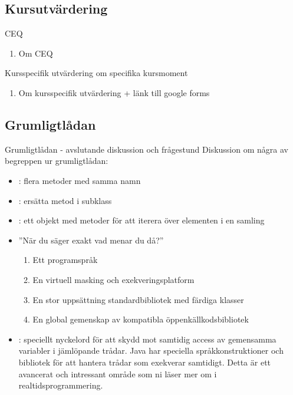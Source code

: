 \documentclass{lecturenotes}
\begin{document}
\subsection{Kursutvärdering}
\begin{Slide}{CEQ}
\begin{enumerate}
\item Om CEQ
\end{enumerate}
\end{Slide}

\begin{Slide}{Kursspecifik utvärdering om specifika kursmoment}
\begin{enumerate}
\item Om kursspecifik utvärdering + länk till google forms
\end{enumerate}
\end{Slide}

\subsection{Grumligtlådan}
\begin{Slide}{Grumligtlådan - avslutande diskussion och frågestund}
Diskussion om några av begreppen ur grumligtlådan: 
\begin{itemize}
\item {}: flera metoder med samma namn
\item {}: ersätta metod i subklass
\item {}: ett objekt med metoder för att iterera över elementen i en samling
\item ''När du säger  exakt vad menar du då?''
\begin{enumerate}
\item Ett programspråk
\item En virtuell masking och exekveringsplatform
\item En stor uppsättning standardbibliotek med färdiga klasser
\item En global gemenskap av kompatibla öppenkällkodsbibliotek
\end{enumerate}
\item {}: speciellt nyckelord för att skydd mot samtidig access av gemensamma variabler i jämlöpande trådar. \footnotesize Java har speciella språkkonstruktioner och bibliotek för att hantera trådar som exekverar samtidigt. Detta är ett avancerat och intressant område som ni läser mer om i realtidsprogrammering.
\end{itemize}
\end{Slide}
\end{document}
